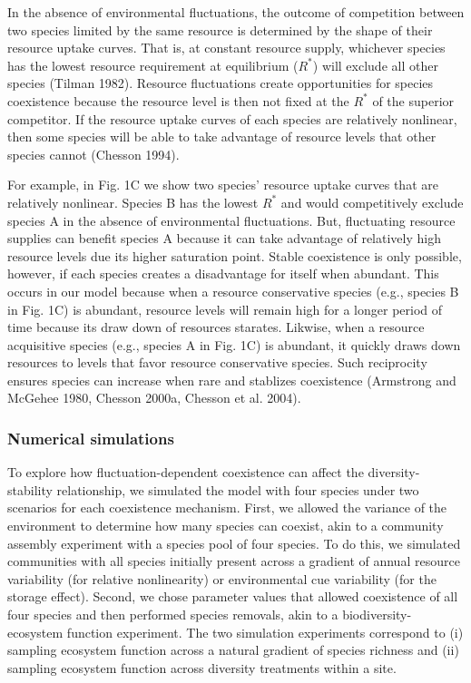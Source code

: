 \documentclass[12pt,]{article}
\begin{document}
In the absence of environmental fluctuations, the outcome of competition
between two species limited by the same resource is determined by the
shape of their resource uptake curves. That is, at constant resource
supply, whichever species has the lowest resource requirement at
equilibrium (\(R^*\)) will exclude all other species (Tilman 1982).
Resource fluctuations create opportunities for species coexistence
because the resource level is then not fixed at the \(R^*\) of the
superior competitor. If the resource uptake curves of each species are
relatively nonlinear, then some species will be able to take advantage
of resource levels that other species cannot (Chesson 1994).

For example, in Fig. 1C we show two species' resource uptake curves that
are relatively nonlinear. Species B has the lowest \(R^*\) and would
competitively exclude species A in the absence of environmental
fluctuations. But, fluctuating resource supplies can benefit species A
because it can take advantage of relatively high resource levels due its
higher saturation point. Stable coexistence is only possible, however,
if each species creates a disadvantage for itself when abundant. This
occurs in our model because when a resource conservative species (e.g.,
species B in Fig. 1C) is abundant, resource levels will remain high for
a longer period of time because its draw down of resources starates.
Likwise, when a resource acquisitive species (e.g., species A in Fig.
1C) is abundant, it quickly draws down resources to levels that favor
resource conservative species. Such reciprocity ensures species can
increase when rare and stablizes coexistence (Armstrong and McGehee
1980, Chesson 2000a, Chesson et al. 2004).

\subsubsection{Numerical simulations}\label{numerical-simulations}

To explore how fluctuation-dependent coexistence can affect the
diversity-stability relationship, we simulated the model with four
species under two scenarios for each coexistence mechanism. First, we
allowed the variance of the environment to determine how many species
can coexist, akin to a community assembly experiment with a species pool
of four species. To do this, we simulated communities with all species
initially present across a gradient of annual resource variability (for
relative nonlinearity) or environmental cue variability (for the storage
effect). Second, we chose parameter values that allowed coexistence of
all four species and then performed species removals, akin to a
biodiversity-ecosystem function experiment. The two simulation
experiments correspond to (i) sampling ecosystem function across a
natural gradient of species richness and (ii) sampling ecosystem
function across diversity treatments within a site.
\end{document}
